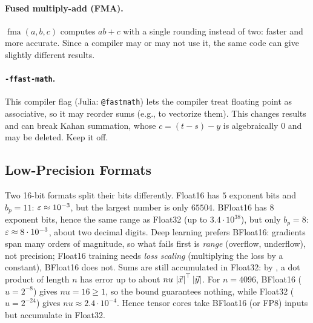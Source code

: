 \paragraph{Fused multiply-add (FMA).} $\operatorname{fma}(a, b, c)$ computes $ab + c$ with a single rounding instead of two: faster and more accurate. Since a compiler may or may not use it, the same code can give slightly different results.

\paragraph{\texttt{-ffast-math}.} This compiler flag (Julia: \texttt{@fastmath}) lets the compiler treat floating point as associative, so it may reorder sums (e.g., to vectorize them). This changes results and can break Kahan summation, whose $c = (t - s) - y$ is algebraically $0$ and may be deleted. Keep it off.

\subsection{Low-Precision Formats}

Two 16-bit formats split their bits differently. Float16 has $5$ exponent bits and $b_p = 11$: $\varepsilon \approx 10^{-3}$, but the largest number is only $65504$. BFloat16 has $8$ exponent bits, hence the same range as Float32 (up to $3.4 \cdot 10^{38}$), but only $b_p = 8$: $\varepsilon \approx 8 \cdot 10^{-3}$, about two decimal digits. Deep learning prefers BFloat16: gradients span many orders of magnitude, so what fails first is \emph{range} (overflow, underflow), not precision; Float16 training needs \emph{loss scaling} (multiplying the loss by a constant), BFloat16 does not. Sums are still accumulated in Float32: by , a dot product of length $n$ has error up to about $nu\,\left\lvert \vec{x} \right\rvert^\top\left\lvert \vec{y} \right\rvert$. For $n = 4096$, BFloat16 ($u = 2^{-8}$) gives $nu = 16 \ge 1$, so the bound guarantees nothing, while Float32 ($u = 2^{-24}$) gives $nu \approx 2.4 \cdot 10^{-4}$. Hence tensor cores take BFloat16 (or FP8) inputs but accumulate in Float32.
